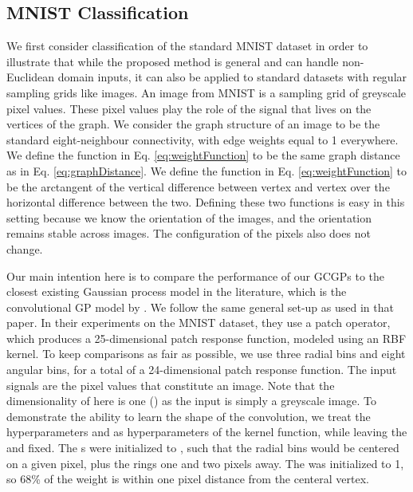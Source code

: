 \documentclass{article}
\begin{document}
\subsection{MNIST Classification}\label{sec:mnist}

We first consider classification of the standard MNIST dataset in order to illustrate that while the proposed method is general and can handle non-Euclidean domain inputs, it can also be applied to standard datasets with regular sampling grids like images. An image from MNIST is a  sampling grid of greyscale pixel values. These pixel values play the role of the signal that lives on the vertices of the graph. We consider the graph structure of an image to be the standard eight-neighbour connectivity, with edge weights equal to 1 everywhere. We define the  function in Eq. \eqref{eq:weightFunction} to be the same graph distance as in Eq. \eqref{eq:graphDistance}. We define the  function in Eq. \eqref{eq:weightFunction} to be the arctangent of the vertical difference between vertex  and vertex  over the horizontal difference between the two. Defining these two functions is easy in this setting because we know the orientation of the images, and the orientation remains stable across images. The configuration of the pixels also does not change.

Our main intention here is to compare the performance of our GCGPs to the closest existing Gaussian process model in the literature, which is the convolutional GP model by \citet{convgp}. We follow the same general set-up as used in that paper. In their experiments on the MNIST dataset, they use a  patch operator, which produces a 25-dimensional patch response function, modeled using an RBF kernel. To keep comparisons as fair as possible, we use three radial bins and eight angular bins, for a total of a 24-dimensional patch response function. The input signals  are the pixel values that constitute an image. Note that the dimensionality of  here is one () as the input is simply a greyscale image. To demonstrate the ability to learn the shape of the convolution, we treat the hyperparameters  and  as hyperparameters of the kernel function, while leaving the  and  fixed. The s were initialized to , such that the radial bins would be centered on a given pixel, plus the rings one and two pixels away. The  was initialized to 1, so 68\% of the weight is within one pixel distance from the centeral vertex.
\end{document}
